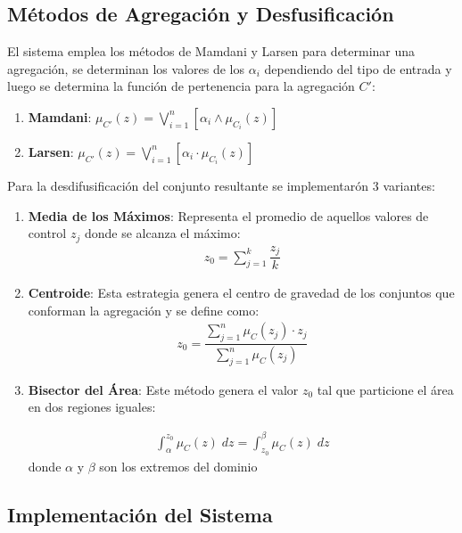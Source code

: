 \documentclass[a4paper,10pt,twocolumn]{article}
\begin{document}
\subsection*{M\'etodos de Agregaci\'on y Desfusificaci\'on}

El sistema emplea los m\'etodos de Mamdani y Larsen para determinar una agregaci\'on, se determinan los valores de los $\alpha_i$ dependiendo del tipo de entrada y luego se determina la funci\'on de pertenencia para la agregaci\'on $C'$:
	\begin{enumerate}
		\item[] \textbf{Mamdani}: $\mu_{C'} (z) = \bigvee_{i=1}^{n} \left[ \alpha_i  \wedge \mu_{C_i} (z) \right]$ 
		
		\item[] \textbf{Larsen}: $\mu_{C'} (z) = \bigvee_{i=1}^{n} \left[ \alpha_i \cdot \mu_{C_i} (z) \right]$
	\end{enumerate}

Para la desdifusificaci\'on del conjunto resultante se implementar\'on 3 variantes:

	\begin{enumerate}
		\item[] \textbf{Media de los M\'aximos}: Representa el promedio de aquellos valores de control $z_j$ donde se alcanza el m\'aximo:
			\begin{align*}
				z_0 = \sum_{j=1}^{k} \dfrac{z_j}{k}
			\end{align*}
		
		\item[] \textbf{Centroide}: Esta estrategia genera el centro de gravedad de los conjuntos que conforman la agregaci\'on y se define como:
			\begin{align*}
				z_0 = \dfrac{\sum_{j=1}^{n} \mu_{C} (z_j) \cdot z_j}{\sum_{j=1}^{n} \mu_{C} (z_j)}
			\end{align*}
		
		\item[] \textbf{Bisector del \'Area}: Este m\'etodo genera el valor $z_0$ tal que particione el \'area en dos regiones iguales:
			
			\begin{align*}
				\int_{\alpha}^{z_0} \mu_C (z) \;dz = \int_{z_0}^{\beta} \mu_C (z) \;dz
			\end{align*}
		donde $\alpha$ y $\beta$ son los extremos del dominio	
		
	\end{enumerate}

\subsection*{Implementaci\'on del Sistema}
\end{document}
